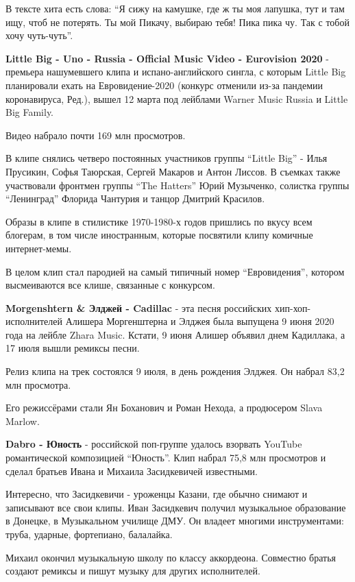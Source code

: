 В тексте хита есть слова: \enquote{Я сижу на камушке, где ж ты моя лапушка, тут и
там ищу, чтоб не потерять. Ты мой Пикачу, выбираю тебя! Пика пика чу. Так
с тобой хочу чуть-чуть}.


\textbf{Little Big - Uno - Russia - Official Music Video - Eurovision 2020} -
премьера нашумевшего клипа и испано-английского сингла, с которым Little
Big планировали ехать на Евровидение-2020 (конкурс отменили из-за пандемии
коронавируса, Ред.), вышел 12 марта под лейблами Warner Music Russia и
Little Big Family. 

Видео набрало почти 169 млн просмотров. 

В клипе снялись четверо постоянных участников группы \enquote{Little Big} - Илья
Прусикин, Софья Таюрская, Сергей Макаров и Антон Лиссов. В съемках также
участвовали фронтмен группы \enquote{The Hatters} Юрий Музыченко, солистка группы
\enquote{Ленинград} Флорида Чантурия и танцор Дмитрий Красилов.

Образы в клипе в стилистике 1970-1980-х годов пришлись по вкусу всем
блогерам, в том числе иностранным, которые посвятили клипу комичные
интернет-мемы.

В целом клип стал пародией на самый типичный номер \enquote{Евровидения},  котором
высмеиваются все клише, связанные с конкурсом.

\textbf{Morgenshtern \& Элджей - Cadillac} - эта песня российских
хип-хоп-исполнителей Алишера Моргенштерна и Элджея была выпущена 9 июня
2020 года на лейбле Zhara Music. Кстати, 9 июня Алишер объявил днем
Кадиллака, а 17 июля вышли ремиксы песни.

Релиз клипа на трек состоялся 9 июля, в день рождения Элджея. Он набрал
83,2 млн просмотра. 

Его режиссёрами стали Ян Боханович и Роман Нехода, а продюсером Slava
Marlow.

\textbf{Dabro - Юность} - российской поп-группе удалось взорвать YouTube
романтической композицией \enquote{Юность}. Клип набрал 75,8 млн просмотров и
сделал братьев Ивана и Михаила Засидкевичей известными.

Интересно, что Засидкевичи - уроженцы Казани, где обычно снимают и
записывают все свои клипы. Иван Засидкевич получил музыкальное образование
в Донецке, в Музыкальном училище ДМУ. Он владеет многими инструментами:
труба, ударные, фортепиано, балалайка.

Михаил окончил музыкальную школу по классу аккордеона. Совместно братья
создают ремиксы и пишут музыку для других исполнителей.

